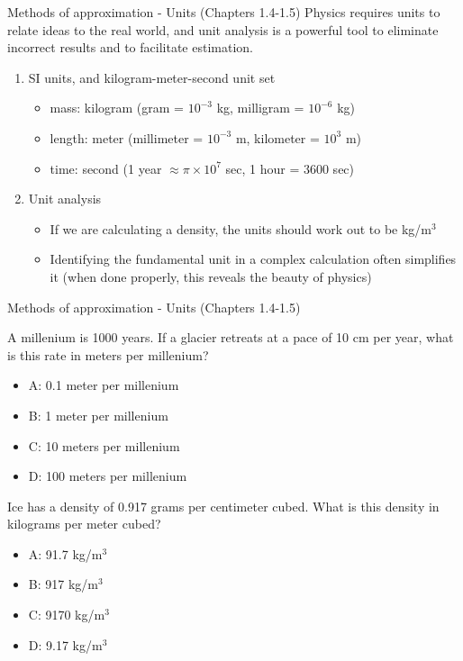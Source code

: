 \documentclass{beamer}
\begin{document}
\begin{frame}{Methods of approximation - Units (Chapters 1.4-1.5)}
Physics requires \alert{units} to relate ideas to the real world, and \alert{unit analysis} is a powerful tool to eliminate incorrect results and to facilitate estimation.
\begin{enumerate}
\item SI units, and kilogram-meter-second unit set
\begin{itemize}
\item mass: \alert{kilogram} (gram = $10^{-3}$ kg, milligram = $10^{-6}$ kg)
\item length: \alert{meter} (millimeter = $10^{-3}$ m, kilometer = $10^{3}$ m)
\item time: \alert{second} (1 year $\approx \pi \times 10^{7}$ sec, 1 hour = 3600 sec)
\end{itemize}
\item Unit analysis
\begin{itemize}
\item If we are calculating a density, the units should work out to be kg/m$^3$
\item Identifying the fundamental unit in a complex calculation often simplifies it (when done properly, this reveals the beauty of physics)
\end{itemize}
\end{enumerate}
\end{frame}

\begin{frame}{Methods of approximation - Units (Chapters 1.4-1.5)}
\small
\begin{minipage}[b]{0.45\linewidth}
A millenium is 1000 years.  If a glacier retreats at a pace of 10 cm per year, what is this rate in meters per millenium?
\vspace{0.2cm}
\begin{itemize}
\item A: 0.1 meter per millenium
\item B: 1 meter per millenium
\item C: 10 meters per millenium
\item D: 100 meters per millenium
\end{itemize}
\end{minipage}
\hspace{0.5cm}
\begin{minipage}[b]{0.45\linewidth}
Ice has a density of 0.917 grams per centimeter cubed.  What is this density in kilograms per meter cubed?
\vspace{1.1cm}
\begin{itemize}
\item A: 91.7 kg/m$^3$
\item B: 917 kg/m$^3$
\item C: 9170 kg/m$^3$
\item D: 9.17 kg/m$^3$
\end{itemize}
\end{minipage}
\end{frame}
\end{document}
